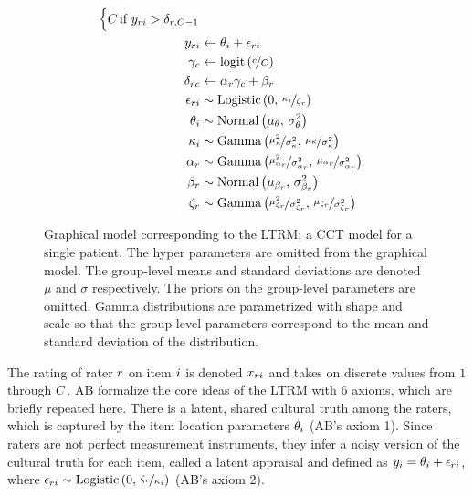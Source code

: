 \documentclass[a4paper]{article}
\newcommand{\AB}{AB}
\begin{document}
\begin{figure}[!ht]
\begin{minipage}{0.5\textwidth}
{\begin{align*}
\begin{cases}
			\Tncat	&\hspace{-.3cm} \text{if } \Appraisal_{\Irater\Iitem} > \Threshold_{\Irater, \Tncat-1}
			\end{cases}\\
			\Appraisal_{\Irater\Iitem} &\leftarrow \ItemTruth_\Iitem + \Error_{\Irater\Iitem}\\
			\UnBiasedThreshold_\Incat &\leftarrow \logit{\nicefrac{\Incat}{\Tncat}}\\
			\Threshold_{\Irater\Incat} &\leftarrow \RaterScale_\Irater \gamma_\Incat + \RaterShift_\Irater\\
			\Error_{\Irater\Iitem}   &\sim \dlogis{0}{\nicefrac{\ItemDifficulty_\Iitem}{\RaterCompetence_\Irater}} \\
			\ItemTruth_\Iitem        &\sim \dnorm{\mu_\ItemTruth}{\sigma_\ItemTruth^2}\\
			\ItemDifficulty_\Iitem   &\sim \dgammaMV{\mu_\ItemDifficulty}{\sigma_\ItemDifficulty^2} \\
			\RaterScale_\Irater      &\sim \dgammaMV{\mu_{\RaterScale_\Irater}}{\sigma_{\RaterScale_\Irater}^2} \\
			\RaterShift_\Irater      &\sim \dnorm{\mu_{\RaterShift_\Irater}}{\sigma_{\RaterShift_\Irater}^2} \\
			\RaterCompetence_\Irater &\sim \dgammaMV{\mu_{\RaterCompetence_\Irater}}{\sigma_{\RaterCompetence_\Irater}^2} \\
		\end{align*}
		}%
	\end{minipage}
	\caption{Graphical model corresponding to the LTRM; a CCT model for a single patient. The hyper parameters are omitted from the graphical model. The group-level means and standard deviations are denoted $\mu$ and $\sigma$ respectively. The priors on the group-level parameters are omitted. Gamma distributions are parametrized with shape and scale so that the group-level parameters correspond to the mean and standard deviation of the distribution.}
	\label{model:LTRM}
\end{figure}
The rating of rater $r$ on item $i$ is denoted $x_{ri}$ and takes on discrete values from $1$ through $\Tncat$. \AB{} formalize the core ideas of the LTRM with 6 axioms, which are briefly repeated here. There is a latent, shared cultural truth among the raters, which is captured by the item location parameters $\theta_i$ (\AB{}'s axiom 1). Since raters are not perfect measurement instruments, they infer a noisy version of the cultural truth for each item, called a latent appraisal and defined as $y_{i} = \theta_i + \epsilon_{ri}$, where $\epsilon_{ri}\sim \text{Logistic}\left(0,\,\nicefrac{\zeta_r}{\kappa_i}\right)$ (\AB{}'s axiom 2). 
\end{document}
